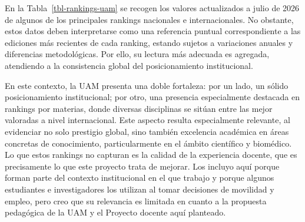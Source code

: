 \documentclass[
  11pt,
  a4paper,
  twoside]{scrreprt}
\begin{document}
En la Tabla~\ref{tbl-rankings-uam} se recogen los valores actualizados a
julio de 2026 de algunos de los principales rankings nacionales e
internacionales. No obstante, estos datos deben interpretarse como una
referencia puntual correspondiente a las ediciones más recientes de cada
ranking, estando sujetos a variaciones anuales y diferencias
metodológicas. Por ello, su lectura más adecuada es agregada, atendiendo
a la consistencia global del posicionamiento institucional.

En este contexto, la UAM presenta una doble fortaleza: por un lado, un
sólido posicionamiento institucional; por otro, una presencia
especialmente destacada en rankings por materias, donde diversas
disciplinas se sitúan entre las mejor valoradas a nivel internacional.
Este aspecto resulta especialmente relevante, al evidenciar no solo
prestigio global, sino también excelencia académica en áreas concretas
de conocimiento, particularmente en el ámbito científico y biomédico. Lo
que estos rankings no capturan es la calidad de la experiencia docente,
que es precisamente lo que este proyecto trata de mejorar. Los incluyo
aquí porque forman parte del contexto institucional en el que trabajo y
porque algunos estudiantes e investigadores los utilizan al tomar
decisiones de movilidad y empleo, pero creo que su relevancia es
limitada en cuanto a la propuesta pedagógica de la UAM y el Proyecto
docente aquí planteado.
\end{document}
